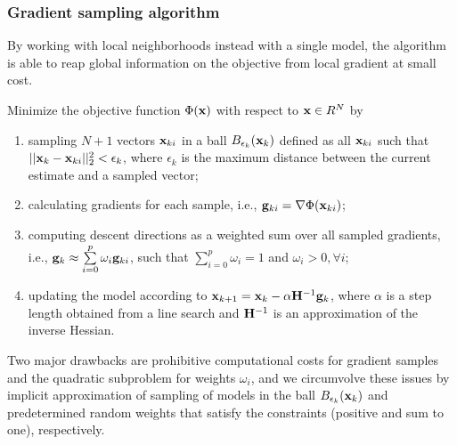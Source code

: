 \subsubsection{Gradient sampling algorithm}
By working with local neighborhoods instead with a single model, the algorithm is able to reap global information on the objective from local gradient at small cost.\par
Minimize the objective function $\Phi(\mathbf{x})$ with respect to $\mathbf{x}\in R^N$ by
\begin{enumerate}[\hspace{10mm}$\bullet$]
  \item sampling $N+1$ vectors $\mathbf{x}_{ki}$ in a ball $B_{\epsilon_k}(\mathbf{x}_k)$ defined as all $\mathbf{x}_{ki}$ such that $||\mathbf{x}_k-\mathbf{x}_{ki}||_2^2<\epsilon_k$, where $\epsilon_k$ is the maximum distance between the current estimate and a sampled vector;
  \item calculating gradients for each sample, i.e., $\mathbf{g}_{ki}=\nabla\Phi(\mathbf{x}_{ki})$;
  \item computing descent directions as a weighted sum over all sampled gradients, i.e., $\mathbf{g}_k\approx\sum\limits_{i=0}^p\omega_i\mathbf{g}_{ki}$, such that $\sum\limits_{i=0}^p\omega_i=1$ and $\omega_i>0,\forall i$;
  \item updating the model according to $\mathbf{x}_{k+1}=\mathbf{x}_k-\alpha\mathbf{H}^{-1}\mathbf{g}_k$, where $\alpha$ is a step length obtained from a line search and $\mathbf{H}^{-1}$ is an approximation of the inverse Hessian.
\end{enumerate}\par
Two major drawbacks are prohibitive computational costs for gradient samples and the quadratic subproblem for weights $\omega_i$, and we circumvolve these issues by implicit approximation of sampling of models in the ball $B_{\epsilon_k}(\mathbf{x}_k)$ and predetermined random weights that satisfy the constraints (positive and sum to one), respectively.\par
